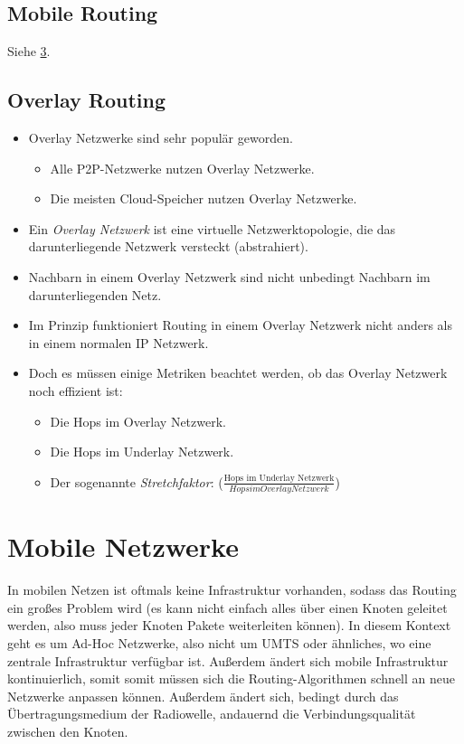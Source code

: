 	\section{Mobile Routing}
		Siehe \ref{c:mobilenetworks}.

	\section{Overlay Routing}
		\begin{itemize}
			\item Overlay Netzwerke sind sehr populär geworden.
				\begin{itemize}
					\item Alle P2P-Netzwerke nutzen Overlay Netzwerke.
					\item Die meisten Cloud-Speicher nutzen Overlay Netzwerke.
				\end{itemize}
			\item Ein \textit{Overlay Netzwerk} ist eine virtuelle Netzwerktopologie, die das darunterliegende Netzwerk versteckt (abstrahiert).
			\item Nachbarn in einem Overlay Netzwerk sind nicht unbedingt Nachbarn im darunterliegenden Netz.
			\item Im Prinzip funktioniert Routing in einem Overlay Netzwerk nicht anders als in einem normalen IP Netzwerk.
			\item Doch es müssen einige Metriken beachtet werden, ob das Overlay Netzwerk noch effizient ist:
				\begin{itemize}
					\item Die Hops im Overlay Netzwerk.
					\item Die Hops im Underlay Netzwerk.
					\item Der sogenannte \textit{Stretchfaktor}: (\( \frac{\text{Hops im Underlay Netzwerk}}{Hops im Overlay Netzwerk} \))
				\end{itemize}
		\end{itemize}

\chapter{Mobile Netzwerke}
	\label{c:mobilenetworks}

	In mobilen Netzen ist oftmals keine Infrastruktur vorhanden, sodass das Routing ein großes Problem wird (es kann nicht einfach alles über einen Knoten geleitet werden, also muss jeder Knoten Pakete weiterleiten können). In diesem Kontext geht es um Ad-Hoc Netzwerke, also nicht um UMTS oder ähnliches, wo eine zentrale Infrastruktur verfügbar ist. Außerdem ändert sich mobile Infrastruktur kontinuierlich, somit somit müssen sich die Routing-Algorithmen schnell an neue Netzwerke anpassen können. Außerdem ändert sich, bedingt durch das Übertragungsmedium der Radiowelle, andauernd die Verbindungsqualität zwischen den Knoten.

